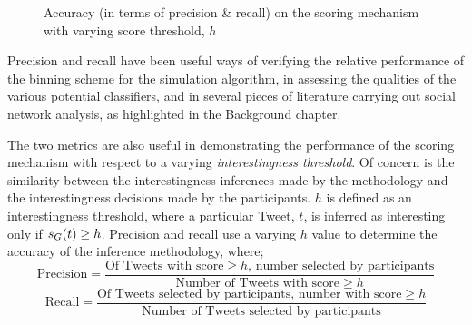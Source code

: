 \begin{figure}
    \centering
    \caption{Accuracy (in terms of precision \& recall) on the scoring mechanism with varying score threshold, $h$}
    \label{fig:precision_recall_twinterest}
\end{figure}

Precision and recall have been useful ways of verifying the relative performance of the binning scheme for the simulation algorithm, in assessing the qualities of the various potential classifiers, and in several pieces of literature carrying out social network analysis, as highlighted in the Background chapter.

The two metrics are also useful in demonstrating the performance of the scoring mechanism with respect to a varying \textit{interestingness threshold}. Of concern is the similarity between the interestingness inferences made by the methodology and the interestingness decisions made by the participants. $h$ is defined as an interestingness threshold, where a particular Tweet, $t$, is inferred as interesting only if $s_G(t) \geq h$. Precision and recall use a varying $h$ value to determine the accuracy of the inference methodology, where;
\[
    \textrm{Precision} = \frac{\textrm{Of Tweets with score} \geq h\textrm{, number selected by participants}}{\textrm{Number of Tweets with score} \geq h}
\]  
\[
    \textrm{Recall} = \frac{\textrm{Of Tweets selected by participants, number with score} \geq h}{\textrm{Number of Tweets selected by participants}}
\]  

